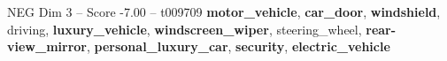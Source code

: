 \begin{textsample}{NEG Dim 3 – Score -7.00 – t009709}  \label{ex:f3_neg_015}
\textbf{motor\_vehicle}, \textbf{car\_door}, \textbf{windshield}, driving, \textbf{luxury\_vehicle}, \textbf{windscreen\_wiper}, steering\_wheel, \textbf{rear-view\_mirror}, \textbf{personal\_luxury\_car}, \textbf{security}, \textbf{electric\_vehicle}

\end{textsample}

